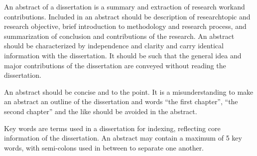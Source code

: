 \begin{eabstract}

  An abstract of a dissertation is a summary and extraction of research workand contributions. Included in an abstract should be description of researchtopic and research objective, brief introduction to methodology and research process, and summarization of conclusion and contributions of the research. An abstract should be characterized by independence and clarity and carry identical information with the dissertation. It should be such that the general idea and major contributions of the dissertation are conveyed without reading the dissertation.

  An abstract should be concise and to the point. It is a misunderstanding to make an abstract an outline of the dissertation and words ``the first chapter'', ``the second chapter'' and the like should be avoided in the abstract.

  Key words are terms used in a dissertation for indexing, reflecting core information of the dissertation. An abstract may contain a maximum of 5 key words, with semi-colons used in between to separate one another.

\end{eabstract}
